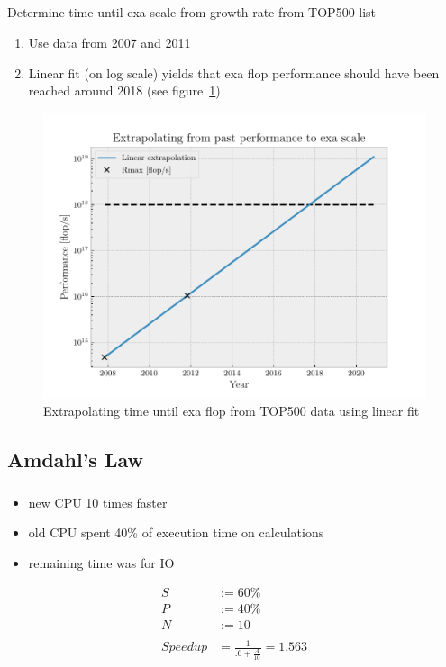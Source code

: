 \documentclass[]{scrartcl}
\begin{document}
\subsection{}
Determine time until exa scale from growth rate from TOP500 list
\begin{enumerate}
	\item Use data from 2007 and 2011
	\item Linear fit (on log scale) yields that exa flop performance should
		have been reached around 2018 (see figure~\ref{fig:GrowthRate})
\end{enumerate}
\begin{figure}[htpb]
	\centering
	\includegraphics[width=0.8\linewidth]{./plots/GrowthRate.pdf}
	\caption{Extrapolating time until exa flop from TOP500 data using linear fit}%
	\label{fig:GrowthRate}
\end{figure}

\newpage
\subsection{Amdahl's Law}
\subsubsection{}
\begin{itemize}
    \item new CPU 10 times faster
    \item old CPU spent 40\% of execution time on calculations
    \item remaining time was for IO
\end{itemize}
\begin{align}
    S &:= 60\%\\
    P &:= 40\%\\
    N &:= 10\\\nonumber\\
    Speedup &= \frac{1}{.6+\frac{.4}{10}} = 1.563
\end{align}
\end{document}
